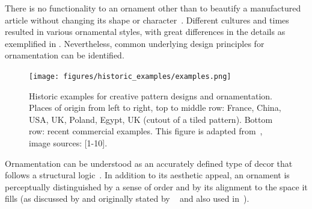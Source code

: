 There is no functionality to an ornament other than to beautify a manufactured article without changing its shape or character~\cite{ward_1896_tpo}.
Different cultures and times resulted in various ornamental styles, with great differences in the details as exemplified in . Nevertheless, common underlying design principles for ornamentation can be identified.

\begin{figure}
       \texttt{[image: figures/historic\_examples/examples.png]}
        \caption[Historic pattern examples]{\label{fig:historic_examples} Historic examples for creative pattern designs and ornamentation. Places of origin from left to right, top to middle row:  France, China, USA, UK, Poland, Egypt, UK (cutout of a tiled pattern). Bottom row: recent commercial examples. This figure is adapted from~\cite{gieseke_2017_ooo}, image sources: [1-10].}
\end{figure}

Ornamentation can be understood as an accurately defined type of decor that follows a structural logic~\cite{ward_1896_tpo, moughtin_1999_udo, arbruzzo_2006_dec}. 
In addition to its aesthetic appeal, an ornament is perceptually distinguished by a sense of order and by its alignment to the space it fills (as discussed by \cite{wong_1998_cgf,gieseke_2017_ooo} and originally stated by \citeauthor*{ward_1896_tpo}~\cite{ward_1896_tpo} and also used in~\cite{dresser_1875_pdd, arbruzzo_2006_dec}). 




